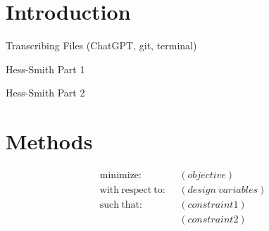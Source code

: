 \documentclass[journal]{new-aiaa} %
\begin{document}
\section{Introduction}
\label{sec:intro}

Transcribing Files (ChatGPT, git, terminal)

Hess-Smith Part 1

Hess-Smith Part 2





\section{Methods}
\label{sec:methods}


\begin{equation} %
\label{eqn:optimization_problem} %
	\begin{aligned}
		\mathrm{minimize:~~} & (objective) \\ %
		\mathrm{with~respect~to:~~} & (design~variables) \\ %
		\mathrm{such~that:~~} & (constraint1) \\ %
					   & (constraint2) \\ %
	\end{aligned}
\end{equation}
\end{document}
